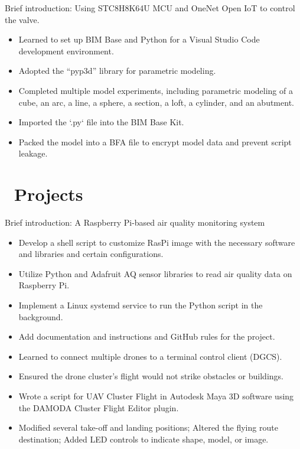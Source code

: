 \documentclass[12pt]{resume}
\begin{document}
Brief introduction:
Using STC8H8K64U MCU and OneNet Open IoT to control the valve.
\begin{itemize}
  \item Learned to set up BIM Base and Python for a Visual Studio Code development environment.
  \item Adopted the “pyp3d” library for parametric modeling.
  \item Completed multiple model experiments, including parametric modeling of a cube, an arc, a line, a sphere, a section, a loft, a cylinder, and an abutment.
  \item Imported the `.py` file into the BIM Base Kit.
  \item Packed the model into a BFA file to encrypt model data and prevent script leakage.
\end{itemize}

\section{\texorpdfstring{\textbf{}\ Projects}{Projects}}

Brief introduction: A Raspberry Pi-based air quality monitoring system
\begin{itemize}
  \item Develop a shell script to customize RasPi image with the necessary software and libraries and certain configurations.
  \item Utilize Python and Adafruit AQ sensor libraries to read air quality data on Raspberry Pi.
  \item Implement a Linux systemd service to run the Python script in the background.
  \item Add documentation and instructions and GitHub rules for the project.
\end{itemize}


\begin{itemize}
  \item Learned to connect multiple drones to a terminal control client (DGCS).
  \item Ensured the drone cluster’s flight would not strike obstacles or buildings.
  \item Wrote a script for UAV Cluster Flight in Autodesk Maya 3D software using the DAMODA Cluster Flight Editor plugin.
  \item Modified several take-off and landing positions; Altered the flying route destination; Added LED controls to indicate shape, model, or image.
\end{itemize}
\end{document}

